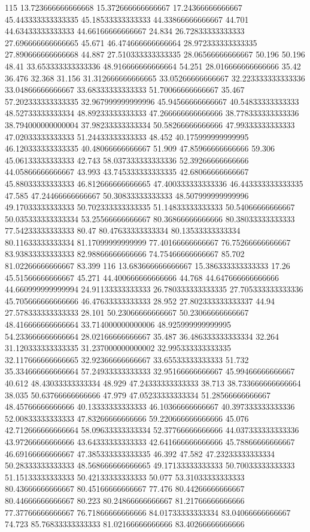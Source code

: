 115 13.723666666666668 15.372666666666667 17.24366666666667 45.443333333333335 45.18533333333333 44.33866666666667 44.701 44.63433333333333 44.66166666666667 24.834 26.72833333333333 27.696666666666665 45.671 46.474666666666664 28.972333333333335 27.890666666666668 44.887 27.510333333333335 28.06566666666667 50.196 50.196 48.41 33.653333333333336 48.916666666666664 54.251 28.016666666666666 35.42 36.476 32.368 31.156 31.312666666666665 33.05266666666667 32.223333333333336 33.04866666666667 33.68333333333333 51.70066666666667 35.467 57.202333333333335 32.967999999999996 45.94566666666667 40.54833333333333 48.52733333333334 48.89233333333333 47.266666666666666 38.778333333333336 38.794000000000004 37.98233333333334 50.58266666666666 47.99333333333333 47.02033333333333 51.24433333333333 48.452 40.175999999999995 46.120333333333335 40.48066666666667 51.909 47.85966666666666 59.306 45.06133333333333 42.743 58.037333333333336 52.39266666666666 44.05866666666667 43.993 43.745333333333335 42.68066666666667 45.88033333333333 46.812666666666665 47.400333333333336 46.443333333333335 47.585 47.24466666666667 50.30833333333333 48.507999999999996 49.17033333333333 50.702333333333335 51.14833333333333 50.54066666666667 50.035333333333334 53.25566666666667 80.36866666666666 80.38033333333333 77.54233333333333 80.47 80.47633333333334 80.13533333333334 80.11633333333334 81.17099999999999 77.40166666666667 76.75266666666667 83.93833333333333 82.98866666666666 74.75466666666667 85.702 81.02266666666667 83.399
116 13.683666666666667 15.386333333333333 17.26 45.51566666666667 45.271 44.400666666666666 44.768 44.647666666666666 44.660999999999994 24.91133333333333 26.780333333333335 27.705333333333336 45.705666666666666 46.47633333333333 28.952 27.802333333333337 44.94 27.578333333333333 28.101 50.23066666666667 50.23066666666667 48.416666666666664 33.714000000000006 48.925999999999995 54.233666666666664 28.02166666666667 35.487 36.486333333333334 32.264 31.120333333333335 31.237000000000002 32.995333333333335 32.117666666666665 32.92366666666667 33.65533333333333 51.732 35.334666666666664 57.24933333333333 32.95166666666667 45.99466666666667 40.612 48.43033333333334 48.929 47.24333333333333 38.713 38.733666666666664 38.035 50.63766666666666 47.979 47.05233333333334 51.28566666666667 48.45766666666666 40.13333333333333 46.10366666666667 40.397333333333336 52.00833333333333 47.83266666666666 59.220666666666666 45.076 42.712666666666664 58.09633333333334 52.37766666666666 44.037333333333336 43.97266666666666 43.64333333333333 42.641666666666666 45.78866666666667 46.69166666666667 47.385333333333335 46.392 47.582 47.23233333333334 50.28333333333333 48.568666666666665 49.17133333333333 50.70033333333333 51.15133333333333 50.42133333333333 50.077 53.31033333333333 80.43666666666667 80.45166666666667 77.476 80.44266666666667 80.44666666666667 80.223 80.24866666666667 81.21766666666666 77.37766666666667 76.71866666666666 84.01733333333334 83.04066666666667 74.723 85.76833333333333 81.02166666666666 83.40266666666666

